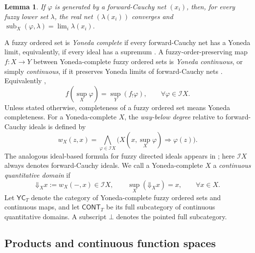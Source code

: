 \documentclass[preprint,3p,times]{elsarticle}
\newtheorem{lemma}[lemma]{Lemma}
\theoremstyle{definition}
\theoremstyle{remark}
\newcommand{\I}{\mathcal{I}}
\newcommand{\CONT}{\mathsf{CONT}}
\newcommand{\YC}{\mathsf{YC}}
\newcommand{\supop}{\operatorname{sup}}
\newcommand{\Down}{\mathord{\Downarrow}}
\newcommand{\subdeg}{\operatorname{sub}}
\newcommand{\tn}{\mathbin{\&}}
\numberwithin{equation}{section}
\begin{document}
\begin{lemma}\cite[Proposition~9.13]{Zhang2024}\label{lem:forward-cauchy-bracket}
If \(\varphi\) is generated by a forward-Cauchy net \((x_i)\), then, for every fuzzy lower set \(\lambda\), the real net \((\lambda(x_i))\) converges and
\(\subdeg_X(\varphi,\lambda)=\lim_i\lambda(x_i).
\)
\end{lemma}


A fuzzy ordered set is \emph{Yoneda complete} if every forward-Cauchy net has a Yoneda limit, equivalently, if every ideal has a supremum \cite[Definition~9.3 and Theorem~9.10]{Zhang2024}. A fuzzy-order-preserving map \(f\colon X\to Y\) between Yoneda-complete fuzzy ordered sets is \emph{Yoneda continuous}, or simply \emph{continuous}, if it preserves Yoneda limits of forward-Cauchy nets \cite[Definition~9.3]{Zhang2024}. 
Equivalently \cite[discussion following Proposition~9.13]{Zhang2024},
\begin{equation}\label{eq:ideal-continuity}
 f(\supop_X\varphi)=\supop_Y(f_!\varphi), \qquad \forall
  \varphi\in\I X.
\end{equation}
Unless stated otherwise, completeness of a fuzzy ordered set means Yoneda completeness. 
For a Yoneda-complete \(X\), the \emph{way-below degree} relative to forward-Cauchy ideals \cite[Section~17, before Proposition~17.3]{Zhang2024} is defined by
\begin{equation}\label{eq:relative-way-below}
 w_X(z,x)=\bigwedge_{\varphi\in\I X}
 \bigl(X(x,\supop_X\varphi)\Rightarrow\varphi(z)\bigr).
\end{equation}
The analogous ideal-based formula for fuzzy directed ideals appears in \cite[Definition~3.1]{SuLi2012}; here \(\I X\) always denotes forward-Cauchy ideals.
We call a Yoneda-complete \(X\) a \emph{continuous quantitative domain} \cite[Definition~17.1 and Proposition~17.3]{Zhang2024} if
\begin{equation}\label{eq:continuity-approximation}
 \Down_X x:=w_X(-,x)\in\I X,
 \qquad
 \supop_X(\Down_X x)=x,
 \qquad \forall x\in X.
\end{equation}
Let \(\YC_T\) denote the category of Yoneda-complete fuzzy ordered sets and continuous maps, and let \(\CONT_T\) be its full subcategory of continuous quantitative domains. A subscript \(\bot\) denotes the pointed full subcategory.

\subsection{Products and continuous function spaces}\label{subsec:existing-categories}
\end{document}

